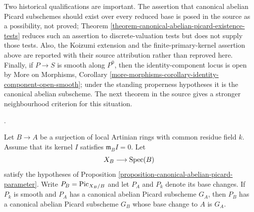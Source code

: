 \begin{remark}
Two historical qualifications are important. The assertion that canonical
abelian Picard subschemes should exist over every reduced base is posed in
the source as a possibility, not proved; Theorem
\ref{theorem-canonical-abelian-picard-existence-tests} reduces such an
assertion to discrete-valuation tests but does not supply those tests. Also,
the Koizumi extension and the finite-primary-kernel assertion above are
reported with their source attribution rather than reproved here. Finally,
if $P \to S$ is smooth along $P^0$, then the identity-component locus is
open by More on Morphisms, Corollary
\ref{more-morphisms-corollary-identity-component-open-smooth}; under the
standing properness hypotheses it is the canonical abelian subscheme. The
next theorem in the source gives a stronger neighbourhood criterion for this
situation.
\end{remark}



\begin{lemma}
\label{lemma-lift-canonical-abelian-picard}
\begin{reference}
\cite[Expos\'e 236, Theorem 3.5, pp. 239--240]{FGA}.
\end{reference}
Let $B \to A$ be a surjection of local Artinian rings with common residue
field $k$. Assume that its kernel $I$ satisfies $\mathfrak m_BI = 0$. Let
$$
X_B \longrightarrow \mathop{\mathrm{Spec}}(B)
$$
satisfy the hypotheses of Proposition
\ref{proposition-canonical-abelian-picard-parameter}. Write
$P_B = \mathrm{Pic}_{X_B/B}$ and let $P_A$ and $P_k$ denote its base
changes. If $P_k$ is smooth and $P_A$ has a canonical
abelian Picard subscheme $G_A$, then $P_B$ has a canonical abelian Picard
subscheme $G_B$ whose base change to $A$ is $G_A$.
\end{lemma}

